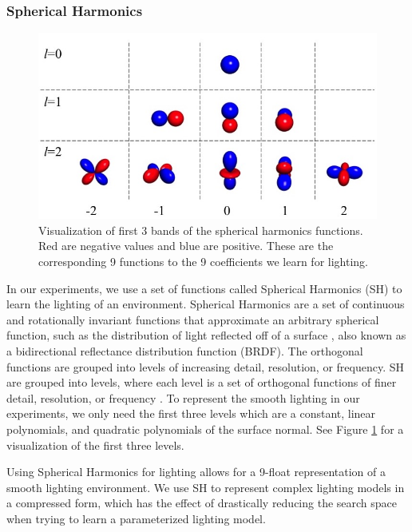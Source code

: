 \documentclass[10pt,twocolumn,letterpaper]{article}
\begin{document}
\subsubsection{Spherical Harmonics}
\begin{figure}[h!]
\centering
\includegraphics[width=1.0\columnwidth]{./assets/SH_Fig.jpg}
\caption{Visualization of first 3 bands of the spherical harmonics functions. Red are negative values and blue are positive. These are the corresponding 9 functions to the 9 coefficients we learn for lighting.}
\label{fig:SHBands01}
\end{figure}

In our experiments, we use a set of functions called Spherical Harmonics (SH) to learn the lighting of an environment. Spherical Harmonics are a set of continuous and rotationally invariant functions that approximate an arbitrary spherical function, such as the distribution of light reflected off of a surface \cite{Ramamoorthi:2001:ERI:383259.383317}, also known as a bidirectional reflectance distribution function (BRDF). The orthogonal functions are grouped into levels of increasing detail, resolution, or frequency. SH are grouped into levels, where each level is a set of orthogonal functions of finer detail, resolution, or frequency \cite{Shreiner:2013:OPG:2544032}.  To represent the smooth lighting in our experiments, we only need the first three levels which are a constant, linear polynomials, and quadratic polynomials of the surface normal. See Figure \ref{fig:SHBands01} for a visualization of the first three levels.

Using Spherical Harmonics for lighting allows for a 9-float representation of a smooth lighting environment. We use SH to represent complex lighting models in a compressed form, which has the effect of drastically reducing the search space when trying to learn a parameterized lighting model.
\end{document}
